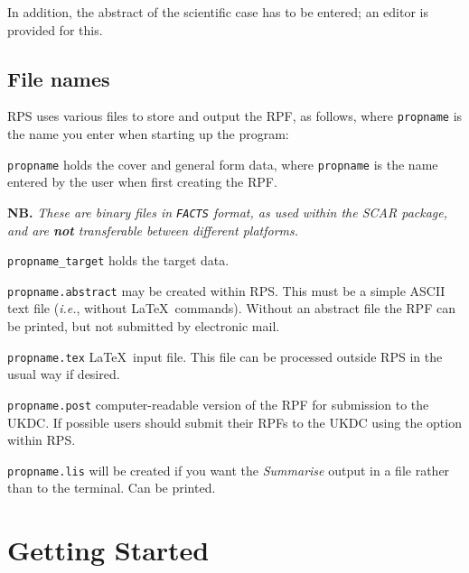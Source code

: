 In addition, the abstract of the scientific case has to be entered; an
editor is provided for this.

\subsection{File names}

RPS uses various files to store and output the RPF, as follows, where
{\tt propname} is the name you enter when starting up the program:

\begin{list}%
{}{\setlength{\leftmargin}{53mm} \setlength{\labelwidth}{40mm} \setlength{\labelsep}{6mm}
\setlength{\listparindent}{0mm} }

\item[{\tt propname} \hfill]  holds the cover and general form
data, where {\tt propname} is the name entered by the user when
first creating the RPF. 

{\bf NB.} \emph{These are binary files in {\tt FACTS}
format, as used within the SCAR package, and are {\bf not} transferable
between different platforms.}

\item[{\tt propname\_target} \hfill] holds the target data. 

\item[{\tt propname.abstract} \hfill] may be created within RPS.
This must be a simple ASCII text file ({\em i.e.}, without \LaTeX\ 
commands).  Without an abstract file the RPF can be printed, but not
submitted by electronic mail.

\item[{\tt propname.tex} \hfill] \LaTeX\ input file. This file can be
processed outside RPS in the usual way if desired.

\item[{\tt propname.post} \hfill] computer-readable version of the
RPF for submission to the UKDC.  If possible users should submit their
RPFs to the UKDC using the option within RPS.

\item[{\tt propname.lis} \hfill] will be created if you want the
{\em Summarise} output in a file rather than to the terminal.  Can be
printed.

\end{list}

\section{\label{se:getting_started}Getting Started}
 
